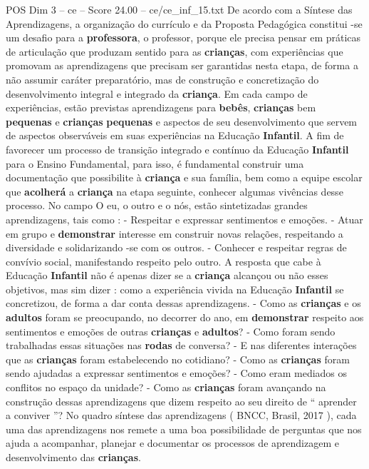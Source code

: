 \begin{textsample}{POS Dim 3 – ce – Score 24.00 – ce/ce\_inf\_15.txt}
De acordo com a Síntese das Aprendizagens, a organização do currículo e da Proposta Pedagógica constitui -se um desafio para a \textbf{professora}, o professor, porque ele precisa pensar em práticas de articulação que produzam sentido para as \textbf{crianças}, com experiências que promovam as aprendizagens que precisam ser garantidas nesta etapa, de forma a não assumir caráter preparatório, mas de construção e concretização do desenvolvimento integral e integrado da \textbf{criança}.
Em cada campo de experiências, estão previstas aprendizagens para \textbf{bebês}, \textbf{crianças} bem \textbf{pequenas} e \textbf{crianças} \textbf{pequenas} e aspectos de seu desenvolvimento que servem de aspectos observáveis em suas experiências na Educação \textbf{Infantil}.
A fim de favorecer um processo de transição integrado e contínuo da Educação \textbf{Infantil} para o Ensino Fundamental, para isso, é fundamental construir uma documentação que possibilite à \textbf{criança} e sua família, bem como a equipe escolar que \textbf{acolherá} a \textbf{criança} na etapa seguinte, conhecer algumas vivências desse processo.
No campo O eu, o outro e o nós, estão sintetizadas grandes aprendizagens, tais como : - Respeitar e expressar sentimentos e emoções. - Atuar em grupo e \textbf{demonstrar} interesse em construir novas relações, respeitando a diversidade e solidarizando -se com os outros. - Conhecer e respeitar regras de convívio social, manifestando respeito pelo outro.
A resposta que cabe à Educação \textbf{Infantil} não é apenas dizer se a \textbf{criança} alcançou ou não esses objetivos, mas sim dizer : como a experiência vivida na Educação \textbf{Infantil} se concretizou, de forma a dar conta dessas aprendizagens. - Como as \textbf{crianças} e os \textbf{adultos} foram se preocupando, no decorrer do ano, em \textbf{demonstrar} respeito aos sentimentos e emoções de outras \textbf{crianças} e \textbf{adultos}? - Como foram sendo trabalhadas essas situações nas \textbf{rodas} de conversa? - E nas diferentes interações que as \textbf{crianças} foram estabelecendo no cotidiano? - Como as \textbf{crianças} foram sendo ajudadas a expressar sentimentos e emoções? - Como eram mediados os conflitos no espaço da unidade? - Como as \textbf{crianças} foram avançando na construção dessas aprendizagens que dizem respeito ao seu direito de “ aprender a conviver ”?
No quadro síntese das aprendizagens ( BNCC, Brasil, 2017 ), cada uma das aprendizagens nos remete a uma boa possibilidade de perguntas que nos ajuda a acompanhar, planejar e documentar os processos de aprendizagem e desenvolvimento das \textbf{crianças}.

\end{textsample}
